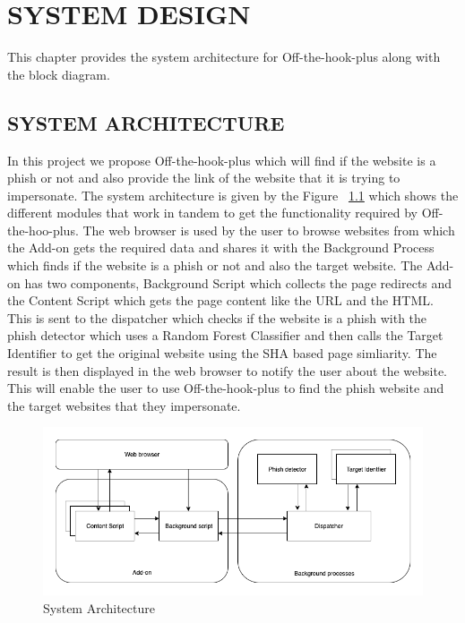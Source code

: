 
\chapter{SYSTEM DESIGN} %

This chapter provides the system architecture for Off-the-hook-plus along with the block diagram.

\section{SYSTEM ARCHITECTURE}

In this project we propose Off-the-hook-plus which will find if the website is a phish or not and also provide the link of the website that it is trying to impersonate. The system architecture is given by the Figure ~\ref{fig:system} which shows the different modules that work in tandem to get the functionality required by Off-the-hoo-plus. The web browser is used by the user to browse websites from which the Add-on gets the required data and shares it with the Background Process which finds if the website is a phish or not and also the target website. The Add-on has two components, Background Script which collects the page redirects and the Content Script which gets the page content like the URL and the HTML. This is sent to the dispatcher which checks if the website is a phish with the phish detector which uses a Random Forest Classifier and then calls the Target Identifier to get the original website using the SHA based page simliarity. The result is then displayed in the web browser to notify the user about the website. This will enable the user to use Off-the-hook-plus to find the phish website and the target websites that they impersonate.

\begin{figure}[htp]
\centering
\includegraphics[scale=0.5]{Figures/image10.png}
\caption{System Architecture}
\label{fig:system}
\end{figure}

